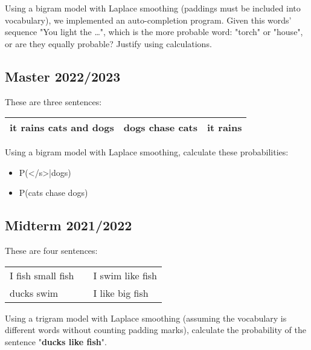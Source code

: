 \documentclass[11pt, a4paper]{article}
\begin{document}
Using a bigram model with Laplace smoothing (paddings must be included into vocabulary), we implemented an auto-completion program. Given this words' sequence "You light the …", which is the more probable word: "torch" or "house", or are they equally probable? Justify using calculations.

\subsection{Master 2022/2023}

These are three sentences:
\begin{center}
	\begin{tabular}{|lll|}
		\hline
		it rains cats and dogs &
		dogs chase cats &
		it rains \\
		\hline
	\end{tabular}
\end{center}

Using a bigram model with Laplace smoothing, calculate these probabilities:
\begin{itemize}
	\item P(</s>|dogs)
	\item P(cats chase dogs)
\end{itemize}

\subsection{Midterm 2021/2022}

These are four sentences:
\begin{center}
	\begin{tabular}{|lll|}
		\hline
		I fish small fish &&
		I swim like fish \\
		ducks swim &&
		I like big fish \\
		\hline
	\end{tabular}
\end{center}

Using a trigram model with Laplace smoothing (assuming the vocabulary is different words without counting padding marks), calculate the probability of the sentence "\textbf{ducks like fish}".
\end{document}

